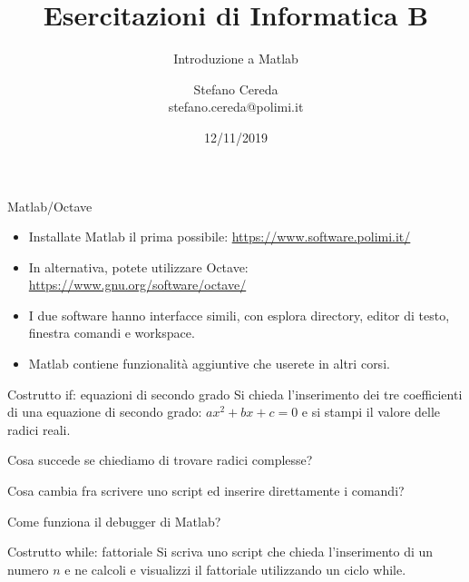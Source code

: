 \documentclass[aspectratio=169, handout]{beamer}
\title{Esercitazioni di Informatica B}
\subtitle{Introduzione a Matlab}
\author{Stefano Cereda\\
	stefano.cereda@polimi.it
}
\date{12/11/2019}
\institute[PoliMi]{Politecnico Milano}
\begin{document}
	\begin{frame}
	\maketitle
\end{frame}



\begin{frame}{Matlab/Octave}
    \begin{itemize}
        \item Installate Matlab il prima possibile: \url{https://www.software.polimi.it/}
        \item In alternativa, potete utilizzare Octave: \url{https://www.gnu.org/software/octave/}
        \item I due software hanno interfacce simili, con esplora directory, editor di testo, finestra comandi e
            workspace.
        \item Matlab contiene funzionalità aggiuntive che userete in altri corsi.
    \end{itemize}
\end{frame}

\begin{frame}{Costrutto if: equazioni di secondo grado}
Si chieda l’inserimento dei tre coefficienti di una equazione di secondo grado: $ax^2+bx+c=0$ e si stampi il valore delle radici reali.


\pause
Cosa succede se chiediamo di trovare radici complesse?

\pause
Cosa cambia fra scrivere uno script ed inserire direttamente i comandi?

\pause
Come funziona il debugger di Matlab?
\end{frame}

\begin{frame}{Costrutto while: fattoriale}
Si scriva uno script che chieda l'inserimento di un numero $n$ e ne calcoli e visualizzi il fattoriale utilizzando un ciclo while.
\end{frame}
\end{document}
